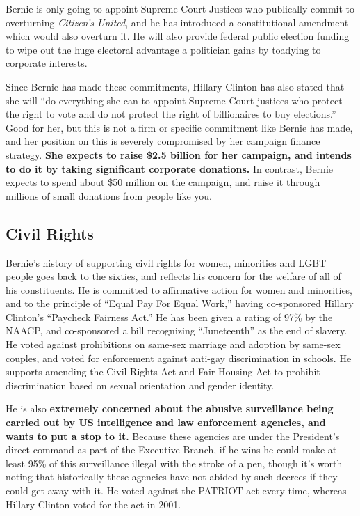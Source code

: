 \documentclass[notumble]{leaflet}
\begin{document}
Bernie is only going to appoint Supreme Court Justices who publically
commit to overturning \emph{Citizen's United}, and he has introduced a
constitutional amendment which would also overturn it.  He will also
provide federal public election funding to wipe out the huge electoral
advantage a politician gains by toadying to corporate interests.

Since Bernie has made these commitments, Hillary Clinton has also
stated that she will ``do everything she can to appoint Supreme Court
justices who protect the right to vote and do not protect the right of
billionaires to buy elections.''  Good for her, but this is not a firm
or specific commitment like Bernie has made, and her position on this
is severely compromised by her campaign finance strategy.  {\bf She
  expects to raise \$2.5 billion for her campaign, and intends to do
  it by taking significant corporate donations.}  In contrast, Bernie
expects to spend about \$50 million on the campaign, and raise it
through millions of small donations from people like you.

\subsection*{Civil Rights}

Bernie's history of supporting civil rights for women, minorities and
LGBT people goes back to the sixties, and reflects his concern for the
welfare of all of his constituents.
He is committed to affirmative action for women and minorities, and to
the principle of ``Equal Pay For Equal Work,'' having co-sponsored
Hillary Clinton's ``Paycheck
Fairness Act.''  He has been given a rating of 97\% by the NAACP, and
co-sponsored a bill recognizing ``Juneteenth''
as the end of slavery.  He voted against prohibitions on same-sex
marriage and adoption by same-sex couples, and voted for enforcement
against anti-gay discrimination in schools.  He supports amending the
Civil Rights Act and Fair Housing Act to prohibit discrimination based
on sexual orientation and gender identity.

He is also {\bf extremely concerned about the abusive surveillance
  being carried out by US intelligence and law enforcement agencies,
  and wants to put a stop to it.}  Because these agencies are under
the President's direct command as part of the Executive Branch, if he
wins he could make at least 95\% of this surveillance illegal with the
stroke of a pen, though it's worth noting that historically these
agencies have not abided by such decrees if they could get away with
it.  He voted against the PATRIOT act every time, whereas Hillary
Clinton voted for the act in 2001.
\end{document}
